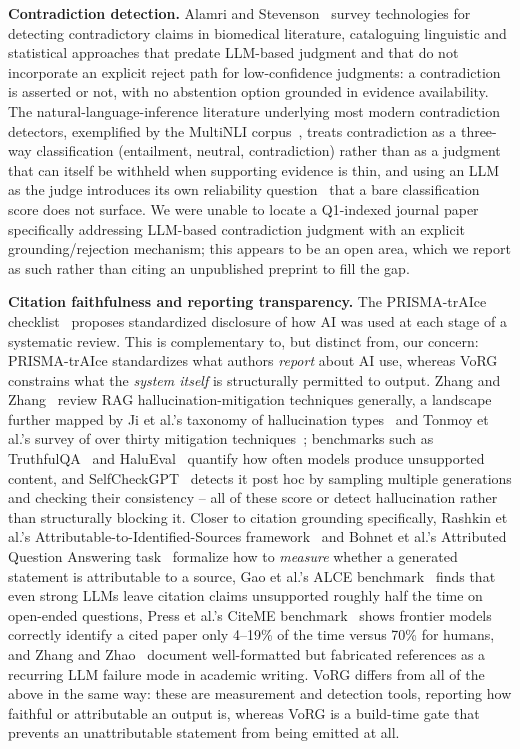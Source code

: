 \documentclass[11pt]{article}
\begin{document}
\textbf{Contradiction detection.} Alamri and Stevenson~\cite{alamri2016contradiction} survey technologies for detecting contradictory claims in biomedical literature, cataloguing linguistic and statistical approaches that predate LLM-based judgment and that do not incorporate an explicit reject path for low-confidence judgments: a contradiction is asserted or not, with no abstention option grounded in evidence availability. The natural-language-inference literature underlying most modern contradiction detectors, exemplified by the MultiNLI corpus~\cite{williams2018broad}, treats contradiction as a three-way classification (entailment, neutral, contradiction) rather than as a judgment that can itself be withheld when supporting evidence is thin, and using an LLM as the judge introduces its own reliability question~\cite{zheng2023judging} that a bare classification score does not surface. We were unable to locate a Q1-indexed journal paper specifically addressing LLM-based contradiction judgment with an explicit grounding/rejection mechanism; this appears to be an open area, which we report as such rather than citing an unpublished preprint to fill the gap.

\textbf{Citation faithfulness and reporting transparency.} The PRISMA-trAIce checklist~\cite{prismatraice2025} proposes standardized disclosure of how AI was used at each stage of a systematic review. This is complementary to, but distinct from, our concern: PRISMA-trAIce standardizes what authors \emph{report} about AI use, whereas VoRG constrains what the \emph{system itself} is structurally permitted to output. Zhang and Zhang~\cite{zhang2025hallucination} review RAG hallucination-mitigation techniques generally, a landscape further mapped by Ji et al.'s taxonomy of hallucination types~\cite{ji2023survey} and Tonmoy et al.'s survey of over thirty mitigation techniques~\cite{tonmoy2024comprehensive}; benchmarks such as TruthfulQA~\cite{lin2022truthfulqa} and HaluEval~\cite{li2023halueval} quantify how often models produce unsupported content, and SelfCheckGPT~\cite{manakul2023selfcheckgpt} detects it post hoc by sampling multiple generations and checking their consistency -- all of these score or detect hallucination rather than structurally blocking it. Closer to citation grounding specifically, Rashkin et al.'s Attributable-to-Identified-Sources framework~\cite{rashkin2023measuring} and Bohnet et al.'s Attributed Question Answering task~\cite{bohnet2022attributed} formalize how to \emph{measure} whether a generated statement is attributable to a source, Gao et al.'s ALCE benchmark~\cite{gao2023enabling} finds that even strong LLMs leave citation claims unsupported roughly half the time on open-ended questions, Press et al.'s CiteME benchmark~\cite{press2024citeme} shows frontier models correctly identify a cited paper only 4--19\% of the time versus 70\% for humans, and Zhang and Zhao~\cite{zhang2025citation} document well-formatted but fabricated references as a recurring LLM failure mode in academic writing. VoRG differs from all of the above in the same way: these are measurement and detection tools, reporting how faithful or attributable an output is, whereas VoRG is a build-time gate that prevents an unattributable statement from being emitted at all.
\end{document}
